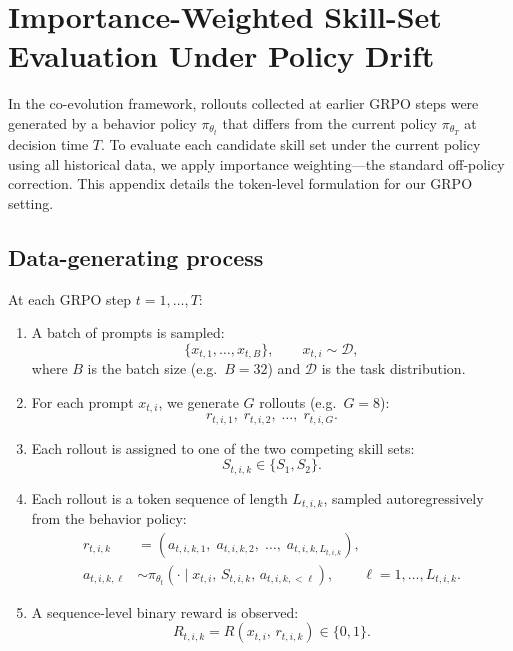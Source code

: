 \section{Importance-Weighted Skill-Set Evaluation Under Policy Drift}
\label{app:iw}

In the co-evolution framework, rollouts collected at earlier GRPO steps were generated by a behavior policy $\pi_{\theta_t}$ that differs from the current policy $\pi_{\theta_T}$ at decision time $T$.  To evaluate each candidate skill set under the current policy using all historical data, we apply importance weighting---the standard off-policy correction.  This appendix details the token-level formulation for our GRPO setting.

\subsection{Data-generating process}
\label{app:iw:data}

At each GRPO step $t = 1, \ldots, T$:

\begin{enumerate}[leftmargin=*]
    \item A batch of prompts is sampled:
    \begin{equation}
        \{x_{t,1}, \ldots, x_{t,B}\}, \qquad x_{t,i} \sim \mathcal{D},
    \end{equation}
    where $B$ is the batch size (e.g.\ $B=32$) and $\mathcal{D}$ is the task distribution.

    \item For each prompt $x_{t,i}$, we generate $G$ rollouts (e.g.\ $G=8$):
    \begin{equation}
        r_{t,i,1},\; r_{t,i,2},\; \ldots,\; r_{t,i,G}.
    \end{equation}

    \item Each rollout is assigned to one of the two competing skill sets:
    \begin{equation}
        S_{t,i,k} \in \{S_1, S_2\}.
    \end{equation}

    \item Each rollout is a token sequence of length $L_{t,i,k}$, sampled autoregressively from the behavior policy:
    \begin{align}
        r_{t,i,k} &= (a_{t,i,k,1},\; a_{t,i,k,2},\; \ldots,\; a_{t,i,k,L_{t,i,k}}), \\
        a_{t,i,k,\ell} &\sim \pi_{\theta_t}(\cdot \mid x_{t,i},\, S_{t,i,k},\, a_{t,i,k,<\ell}), \qquad \ell = 1, \ldots, L_{t,i,k}.
    \end{align}

    \item A sequence-level binary reward is observed:
    \begin{equation}
        R_{t,i,k} = R(x_{t,i},\, r_{t,i,k}) \in \{0, 1\}.
    \end{equation}
\end{enumerate}

